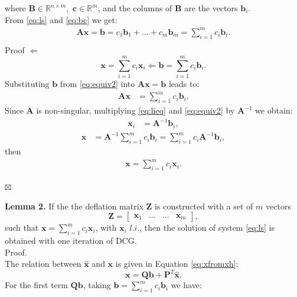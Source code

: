 \documentclass[review]{elsarticle}
\begin{document}
where $\mathbf{B} \in \mathbb{R}^{n\times m},$ $\mathbf{c} \in \mathbb{R}^{m}$, and the columns of $\mathbf{B}$
are the vectors $\mathbf{b}_i$.\\
From \eqref{eq:ls} and \eqref{eq:bc} we get:
\begin{align*}
\mathbf{A}\mathbf{x}=\mathbf{b}=c_1\mathbf{b}_1+...+c_m\mathbf{b}_m=\sum_{i=1}^m {c}_i\mathbf{b}_i.\\
\end{align*}
Proof $\Leftarrow $
\begin{equation}\label{eq:equiv2}
\mathbf{x}=\sum_{i=1}^m {c}_i\mathbf{x}_i\Leftarrow \mathbf{b}=\sum_{i=1}^m {c}_i\mathbf{b}_i .
\end{equation}
Substituting $\mathbf{b}$ from \eqref{eq:equiv2} into $\mathbf{A}\mathbf{x}=\mathbf{b}$ leads to:
\begin{align}%
\mathbf{A}\mathbf{x}&=\sum_{i=1}^m {c}_i\mathbf{b}_i.
\end{align}
Since $\mathbf{A}$ is non-singular, multiplying \eqref{eq:lieq} and \eqref{eq:equiv2} by $\mathbf{A}^{-1}$ we obtain:
\begin{align*}%
\mathbf{x}_i&=\mathbf{A}^{-1}\mathbf{b}_i,
\end{align*}
\begin{align*}%
\mathbf{x}&=\mathbf{A}^{-1}\sum_{i=1}^m {c}_i\mathbf{b}_i=\sum_{i=1}^m {c}_i\mathbf{A}^{-1}\mathbf{b}_i,
\end{align*}
then 
\begin{align}\label{eq:equiv21}
\mathbf{x}=\sum_{i=1}^m {c}_i\mathbf{x}_i.
\end{align}
\begin{flushright}
$\boxtimes $                
\end{flushright}
\textbf{Lemma 2.}
If the the deflation matrix $\mathbf{Z}$ is constructed with a set of $m$ vectors 
\begin{equation}
 \mathbf{Z}=
\begin{bmatrix}
\mathbf{x}_1&...&...&\mathbf{x}_m
\end{bmatrix}, 
\end{equation}
such that $\mathbf{x}=\sum_{i=1}^m {c}_i\mathbf{x}_i$, with $\mathbf{x}_i$ $l.i.$, then the solution of
system \eqref{eq:ls} is obtained with one iteration of DCG.\\
Proof.\\
The relation between $\mathbf{\hat{x}}$ and $\mathbf{x}$ is given in Equation \eqref{eq:xfromxh}:
\begin{equation*}
    \mathbf{x}=\mathbf{Q}\mathbf{b}+\mathbf{P}^T\mathbf{\hat{x}}. 
\end{equation*}
For the first term $\mathbf{Q}\mathbf{b}$, taking $\mathbf{b}=\sum_{i=1}^m {c}_i\mathbf{b}_i$ we have:
\end{document}
